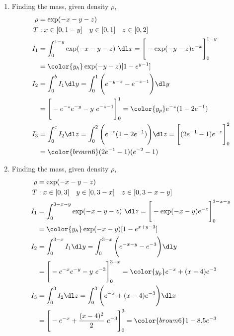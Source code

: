 \begin{enumerate}
     \item Finding the mass, given density $ \rho $,
           \begin{align}
                \rho & = \exp(-x-y-z)                                         \\
                T    & : x \in [0, 1-y] \quad y \in [0, 1] \quad z \in [0, 2] \\
                I_1  & = \int_{0}^{1-y} \exp(-x-y-z)\ \dl x
                = \Bigg[ -\exp(-y-z)e^{-x} \Bigg]_{0}^{1-y}                   \\
                     & = {\color{y_h} \exp(-y-z) [1 - e^{y-1}]}               \\
                I_2  & = \int_{0}^{b}I_1 \dl y = \int_{0}^{1}
                \Bigg( e^{-y-z} - e^{-z-1} \Bigg) \dl y                       \\
                     & = \Bigg[ -e^{-z}e^{-y} - y\ e^{-z-1} \Bigg]_{0}^{1}
                = {\color{y_p} e^{-z} (1 - 2e^{-1})}                          \\
                I_3  & = \int_{0}^{c} I_2 \dl z = \int_{0}^{2}
                \Bigg( e^{-z} (1 - 2e^{-1}) \Bigg) \dl z
                = \Bigg[ (2e^{-1} - 1)e^{-z} \Bigg]_0^2                       \\
                     & = {\color{brown6} (2e^{-1} - 1)(e^{-2} - 1)}
           \end{align}

     \item Finding the mass, given density $ \rho $,
           \begin{align}
                \rho & = \exp(-x-y-z)                                             \\
                T    & : x \in [0, 3] \quad y \in [0, 3-x] \quad z \in [0, 3-x-y] \\
                I_1  & = \int_{0}^{3-x-y} \exp(-x-y-z)\ \dl z
                = \Bigg[ -\exp(-x-y)e^{-z} \Bigg]_{0}^{3-x-y}                     \\
                     & = {\color{y_h} \exp(-x-y) [1 - e^{x+y-3}]}                 \\
                I_2  & = \int_{0}^{3-x}I_1 \dl y = \int_{0}^{3-x}
                \Bigg( e^{-x-y} - e^{-3} \Bigg) \dl y                             \\
                     & = \Bigg[ -e^{-x}e^{-y} - y\ e^{-3} \Bigg]_{0}^{3-x}
                = {\color{y_p} e^{-x} + (x-4)e^{-3}}                              \\
                I_3  & = \int_{0}^{3} I_2 \dl z = \int_{0}^{3}
                \Bigg( e^{-x} + (x-4)e^{-3} \Bigg) \dl x                          \\
                     & = \Bigg[ -e^{-x} + \frac{(x-4)^2}{2}\ e^{-3} \Bigg]_0^3
                = {\color{brown6} 1 - 8.5e^{-3}}
           \end{align}


\end{enumerate}
